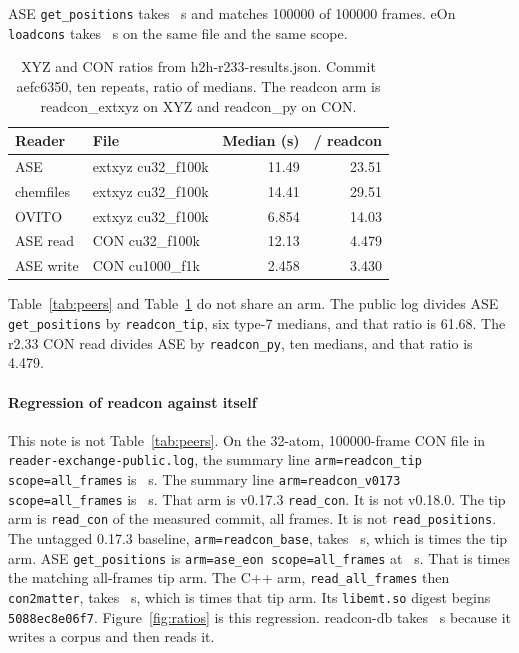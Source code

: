 \documentclass[preprint,12pt]{elsarticle}
\begin{document}
ASE \texttt{get\_positions} takes \rcAseMedian~s and matches 100000 of
100000 frames.
eOn \texttt{loadcons} takes \rcEonMedian~s on the same file and the same
scope.

\begin{table}[tbp] \centering \footnotesize
\caption{XYZ and CON ratios from h2h-r233-results.json. Commit aefc6350, ten repeats, ratio of medians. The readcon arm is readcon\_extxyz on XYZ and readcon\_py on CON.}
\label{tab:peers-r233}
\begin{tabular}{@{}llrr@{}}
\toprule
Reader & File & Median (s) & / readcon \\
\midrule
ASE & extxyz cu32\_f100k & 11.49 & 23.51 \\
chemfiles & extxyz cu32\_f100k & 14.41 & 29.51 \\
OVITO & extxyz cu32\_f100k & 6.854 & 14.03 \\
ASE read & CON cu32\_f100k & 12.13 & 4.479 \\
ASE write & CON cu1000\_f1k & 2.458 & 3.430 \\
\bottomrule
\end{tabular}
\end{table}

Table~\ref{tab:peers} and Table~\ref{tab:peers-r233} do not share an
arm.
The public log divides ASE \texttt{get\_positions} by
\texttt{readcon\_tip}, six type-7 medians, and that ratio is 61.68.
The r2.33 CON read divides ASE by \texttt{readcon\_py}, ten medians, and
that ratio is 4.479.

\paragraph{Regression of readcon against itself} This note is not
Table~\ref{tab:peers}.
On the 32-atom, 100000-frame CON file in
\texttt{reader-exchange-public.log}, the summary line
\texttt{arm=readcon\_tip scope=all\_frames} is \rcTipMedian~s.
The summary line \texttt{arm=readcon\_v0173 scope=all\_frames} is
\rcFullOneMedian~s.
That arm is v0.17.3 \texttt{read\_con}.
It is not v0.18.0.
The tip arm is \texttt{read\_con} of the measured commit, all frames.
It is not \texttt{read\_positions}.
The untagged 0.17.3 baseline, \texttt{arm=readcon\_base}, takes
\rcReleaseMedian~s, which is \rcTipOverRelease{} times the tip arm.
ASE \texttt{get\_positions} is \texttt{arm=ase\_eon scope=all\_frames}
at \rcAseMedian~s.
That is \rcTipOverAse{} times the matching all-frames tip arm.
The C++ arm, \texttt{read\_all\_frames} then \texttt{con2matter}, takes
\rcApiMedian~s, which is \rcApiOverRead{} times that tip arm.
Its \texttt{libemt.so} digest begins \texttt{5088ec8e06f7}.
Figure~\ref{fig:ratios} is this regression.
readcon-db takes \rcDbMedian~s because it writes a corpus and then reads
it.
\end{document}
